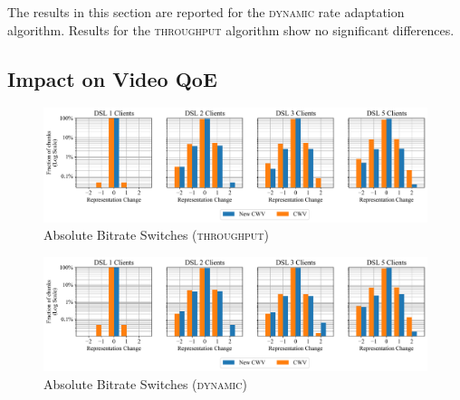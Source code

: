\documentclass[10pt,sigconf]{acmart}
\begin{document}
The results in this section are reported for the \textsc{dynamic} rate adaptation algorithm. Results for the \textsc{throughput} algorithm show no significant differences.

\subsection{Impact on Video QoE}
\label{sec:QoE-impact}

\begin{figure}
  \centering
  \includegraphics[width=\textwidth, keepaspectratio]{figures/bitrate_derivative_distribution.pdf}
  \caption{Absolute Bitrate Switches (\textsc{throughput})}
  \label{fig:bitrate-switches}
\end{figure}

\begin{figure}
  \centering
  \includegraphics[width=\textwidth, keepaspectratio]{figures/bitrate_derivative_distribution_dynamic.pdf}
  \caption{Absolute Bitrate Switches (\textsc{dynamic})}
  \label{fig:bitrate-switches-dynamic}
\end{figure}
\end{document}
